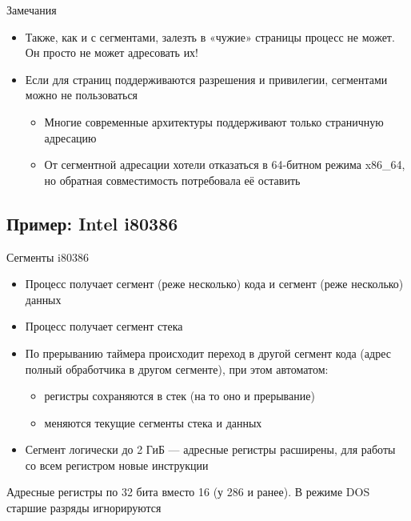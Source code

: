\documentclass[xetex,aspectratio=43]{beamer}
\begin{document}
\begin{frame}{Замечания}
    \begin{itemize}
        \item
        Также, как и с сегментами, залезть в «чужие» страницы процесс не
        может. Он просто не может адресовать их!
        \item
        Если для страниц поддерживаются разрешения и привилегии, сегментами
        можно не пользоваться

        \begin{itemize}
            \item
            Многие современные архитектуры поддерживают только страничную
            адресацию
            \item
            От сегментной адресации хотели отказаться в 64-битном режима
            x86\_64, но обратная совместимость потребовала её оставить
        \end{itemize}
    \end{itemize}
\end{frame}

\subsection{Пример: Intel i80386}

\begin{frame}{Сегменты i80386}
    \begin{itemize}
        \tightlist
        \item
        Процесс получает сегмент (реже несколько) кода и сегмент (реже
        несколько) данных
        \item
        Процесс получает сегмент стека
        \item
        По прерыванию таймера происходит переход в другой сегмент кода (адрес
        полный обработчика в другом сегменте), при этом автоматом:

        \begin{itemize}
            \tightlist
            \item
            регистры сохраняются в стек (на то оно и прерывание)
            \item
            меняются текущие сегменты стека и данных
        \end{itemize}
        \item
        Сегмент логически до 2 ГиБ --- адресные регистры расширены, для работы
        со всем регистром новые инструкции
    \end{itemize}

    Адресные регистры по 32 бита вместо 16 (у 286 и ранее). В режиме DOS старшие разряды
    игнорируются
\end{frame}
\end{document}
